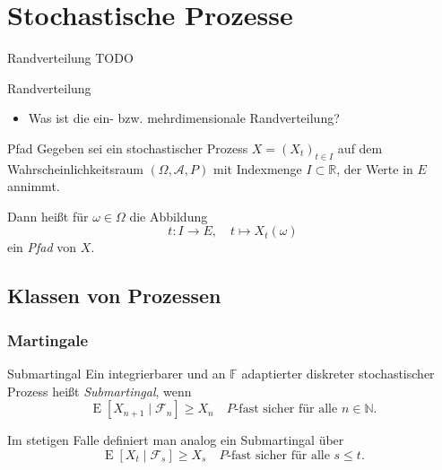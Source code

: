 \section{Stochastische Prozesse}

\begin{defi}{Randverteilung}
    TODO
\end{defi}

\begin{info}{Randverteilung}
    \begin{itemize}
        \item Was ist die ein- bzw. mehrdimensionale Randverteilung?
    \end{itemize}
\end{info}

\begin{defi}{Pfad}
    Gegeben sei ein stochastischer Prozess $X=(X_{t})_{t\in I}$ auf dem Wahrscheinlichkeitsraum $(\Omega ,{\mathcal{A}},P)$ mit Indexmenge $I\subset \mathbb{R}$, der Werte in $E$ annimmt.

    Dann heißt für $\omega \in \Omega$ die Abbildung
    \[
        t: I \to E, \quad t\mapsto X_{t}(\omega)
    \]
    ein \emph{Pfad} von $X$.
\end{defi}

\subsection{Klassen von Prozessen}

\subsubsection{Martingale}

\begin{defi}[Martingal]{Submartingal}
    Ein integrierbarer und an $\mathbb{F}$ adaptierter diskreter stochastischer Prozess heißt \emph{Submartingal}, wenn
    \[
        \operatorname{E} [X_{n+1} \mid{\mathcal{F}}_{n}] \geq X_{n} \quad P\text{-fast sicher für alle } n\in \mathbb{N}.
    \]

    Im stetigen Falle definiert man analog ein Submartingal über
    \[
        \operatorname{E} [X_{t} \mid{\mathcal{F}}_{s}] \geq X_{s} \quad P\text{-fast sicher für alle } s\leq t.
    \]
\end{defi}

